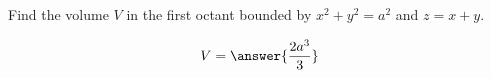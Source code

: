 \documentclass{ximera}
\author{David Guichard \and Neal Koblitz \and H. Jerome Keisler \and Albert Scheller \and Barry Balof \and Mike Wills \and Matthew Carr}
\begin{document}
\begin{exercise}




Find the volume $V$ in the first octant bounded by $x^2+y^2=a^2$ and $z=x+y$.
\begin{prompt}
\[
V=\answer{\frac{2a^3}{3}}
\]
\end{prompt}



\end{exercise}
\end{document}
